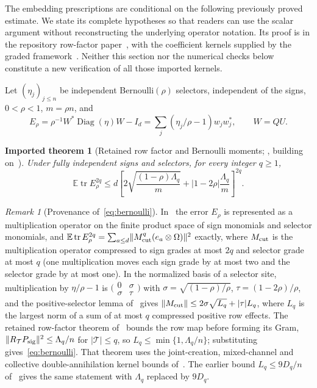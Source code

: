 \documentclass[11pt,a4paper]{article}
\newtheorem{imported}[theorem]{Imported theorem}
\theoremstyle{definition}
\theoremstyle{remark}
\newtheorem{remark}[theorem]{Remark}
\numberwithin{equation}{section}
\newcommand{\E}{\mathbb E}
\newcommand{\tr}{\operatorname{tr}}
\newcommand{\Diag}{\operatorname{Diag}}
\newcommand{\norm}[1]{\lVert#1\rVert}
\newcommand{\cT}{\mathcal T}
\begin{document}
The embedding prescriptions are conditional on the following previously
proved estimate. We state its complete hypotheses so that readers can use
the scalar argument without reconstructing the underlying operator
notation. Its proof is in the repository row-factor paper~\cite{HY},
with the coefficient kernels supplied by the graded framework~\cite{V11}.
Neither this section nor the numerical checks below constitute a new
verification of all those imported kernels.

Let
$(\eta_j)_{j\le n}$ be independent Bernoulli$(\rho)$ selectors, independent of
the signs, $0<\rho<1$, $m=\rho n$, and
\[
 E_\rho=\rho^{-1}W^*\Diag(\eta)W-I_d=\sum_j(\eta_j/\rho-1)w_jw_j^*,
 \qquad W=QU .
\]

\begin{imported}[Retained row factor and Bernoulli moments; \cite{HY}, building on~\cite{V11}]
\label{imp:bernoulli}
Under fully independent signs and selectors, for every integer $q\ge1$,
\begin{equation}\label{eq:bernoulli}
 \E\tr E_\rho^{2q}\le d\left[2\sqrt{\frac{(1-\rho)\Lambda_q}{m}}
 +|1-2\rho|\frac{\Lambda_q}{m}\right]^{2q}.
\end{equation}
\end{imported}

\begin{remark}[Provenance of~\eqref{eq:bernoulli}]
In~\cite{V11} the error $E_\rho$ is represented as a multiplication operator
on the finite product space of sign monomials and selector monomials, and
$\E\tr E_\rho^{2q}=\sum_{a\le d}\norm{M_{\rm cut}^q(e_a\otimes\Omega)}^2$
exactly, where $M_{\rm cut}$ is the multiplication operator compressed to
sign grades at most $2q$ and selector grade at most $q$ (one multiplication
moves each sign grade by at most two and the selector grade by at most one).
In the normalized basis of a selector site, multiplication by $\eta/\rho-1$ is
$\bigl(\begin{smallmatrix}0&\sigma\\\sigma&\tau\end{smallmatrix}\bigr)$ with
$\sigma=\sqrt{(1-\rho)/\rho}$, $\tau=(1-2\rho)/\rho$, and the positive-selector
lemma of~\cite{V11} gives $\norm{M_{\rm cut}}\le2\sigma\sqrt{L_q}+|\tau|L_q$,
where $L_q$ is the largest norm of a sum of at most $q$ compressed positive
row effects. The retained row-factor theorem of~\cite{HY} bounds the row map
before forming its Gram,
$\norm{R_\cT P_{\rm sig}}^2\le\Lambda_q/n$ for $|\cT|\le q$, so
$L_q\le\min\{1,\Lambda_q/n\}$; substituting gives~\eqref{eq:bernoulli}. That
theorem uses the joint-creation, mixed-channel and collective
double-annihilation kernel bounds of~\cite{V11}. The earlier bound
$L_q\le9D_q/n$ of~\cite{V11} gives the same statement with $\Lambda_q$
replaced by $9D_q$.
\end{remark}
\end{document}
